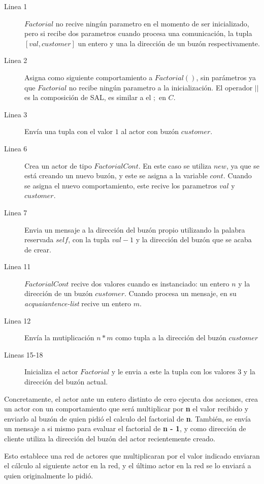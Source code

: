 \begin{description}

\item [Linea 1] $Factorial$ no recive ningún parametro en el momento de ser inicializado, pero si recibe dos parametros cuando procesa una comunicación, la tupla $[val, customer]$ un entero y una la dirección de un buzón respectivamente.
\item [Linea 2] Asigna como siguiente comportamiento a $Factorial()$, sin parámetros ya que $Factorial$ no recibe ningún parametro a la inicialización. El operador $||$ es la composición de SAL, es similar a el $;$ en $C$. 
\item [Linea 3] Envía una tupla con el valor $1$ al actor con buzón $customer$.
\item [Linea 6] Crea un actor de tipo $FactorialCont$. En este caso se utiliza $new$, ya que se está creando un nuevo buzón, y este se asigna a la variable $cont$. Cuando se asigna el nuevo comportamiento, este recive los parametros $val$ y $customer$.
\item [Linea 7] Envia un mensaje a la dirección del buzón propio utilizando la palabra reservada $self$, con la tupla $val - 1$ y la dirección del buzón que se acaba de crear.
\item [Linea 11] $FactorialCont$ recive dos valores cuando es instanciado: un entero $n$ y la dirección de un buzón $customer$. Cuando procesa un mensaje, en su \textit{acquaiantence-list} recive un entero $m$.
\item [Linea 12] Envía la mutiplicación $n*m$ como tupla a la dirección del buzón $customer$ 
\item [Lineas 15-18] Inicializa el actor $Factorial$ y le envia a este la tupla con los valores $3$ y la dirección del buzón actual. 

\end{description}

Concretamente, el actor ante un entero distinto de cero ejecuta dos acciones, crea un actor con
un comportamiento que será multiplicar por \textbf{n} el valor recibido y
enviarlo al buzón de quien pidió el calculo del factorial de \textbf{n}.
También, se envía un mensaje a si mismo para evaluar el factorial de \textbf{n - 1}, y como dirección de cliente utiliza la dirección del buzón del actor
recientemente creado. 

Esto establece una red de actores que multiplicaran por  el valor indicado enviaran el cálculo al siguiente actor en la red, y el último actor 
en la red se lo enviará a quien originalmente lo pidió. 

